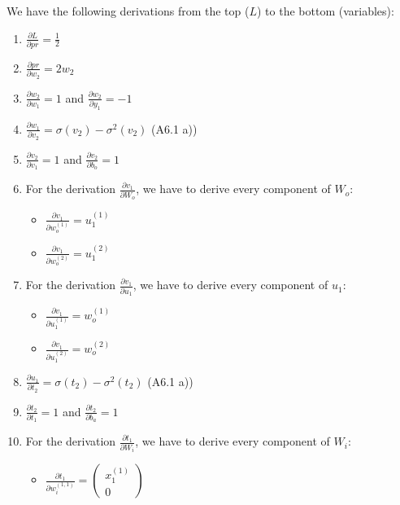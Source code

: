 \documentclass[a4paper]{article}
\begin{document}
        We have the following derivations from the top ($L$) to the bottom (variables):
        \begin{enumerate}
            \item $\frac{\partial L}{\partial pr} = \frac{1}{2}$
            \item $\frac{\partial pr}{\partial w_2} = 2 w_2$
            \item $\frac{\partial w_2}{\partial w_1} = 1$ and $\frac{\partial w_2}{\partial y_1} = -1$
            \item $\frac{\partial w_1}{\partial v_2} = \sigma(v_2) - \sigma^2(v_2)$ (A6.1 a))
            \item $\frac{\partial v_2}{\partial v_1} = 1$ and $\frac{\partial v_2}{\partial b_o} = 1$
            \item For the derivation $\frac{\partial v_1}{\partial W_o}$, we have to derive every component of $W_o$:
                \begin{itemize}
                    \item $\frac{\partial v_1}{\partial w_o^{(1)}} = u_1^{(1)}$
                    \item $\frac{\partial v_1}{\partial w_o^{(2)}} = u_1^{(2)}$
                \end{itemize} 
            \item For the derivation $\frac{\partial v_1}{\partial u_1}$, we have to derive every component of $u_1$:
                \begin{itemize}
                    \item $\frac{\partial v_1}{\partial u_1^{(1)}} = w_o^{(1)}$
                    \item $\frac{\partial v_1}{\partial u_1^{(2)}} = w_o^{(2)}$
                \end{itemize} 
            \item $\frac{\partial u_1}{\partial t_2} = \sigma(t_2) - \sigma^2(t_2)$ (A6.1 a))
            \item $\frac{\partial t_2}{\partial t_1} = 1$ and $\frac{\partial t_2}{\partial b_a} = 1$
            \item For the derivation $\frac{\partial t_1}{\partial W_i}$, we have to derive every component of $W_i$:
                \begin{itemize}
                    \item $\frac{\partial t_1}{\partial w_i^{(1,1)}} = \left( \begin{matrix} x_1^{(1)} \\ 0 \end{matrix} \right)$

\end{itemize}
\end{enumerate}
\end{document}
